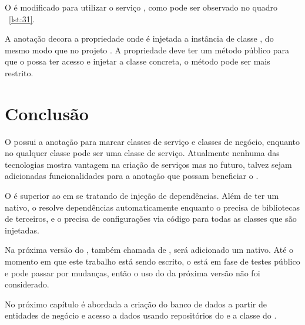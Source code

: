 O   é modificado para utilizar o serviço , como pode ser observado no quadro ~\ref{lst:31}.


A anotação  decora a propriedade  onde é injetada a instância de classe , do mesmo modo que  no projeto . A propriedade deve ter um método  público para que o  possa ter acesso e injetar a classe concreta, o método  pode ser mais restrito.

\section{Conclusão}

O  possui a anotação  para marcar classes de serviço e classes de negócio, enquanto no  qualquer classe pode ser uma classe de serviço. Atualmente nenhuma das tecnologias mostra vantagem na criação de serviços mas no futuro, talvez sejam adicionadas funcionalidades para a anotação  que possam beneficiar o .

O  é superior ao  em se tratando de injeção de dependências. Além de ter um  nativo, o  resolve dependências automaticamente enquanto o  precisa de bibliotecas de terceiros, e o  precisa de configurações via código para todas as classes que são injetadas.

Na próxima versão do , também chamada de , será adicionado um  nativo. Até o momento em que este trabalho está sendo escrito, o  está em fase de testes público e pode passar por mudanças, então o uso do  da próxima versão não foi considerado.

No próximo capítulo é abordada a criação do banco de dados a partir de entidades de negócio e acesso a dados usando repositórios do  e a classe  do .